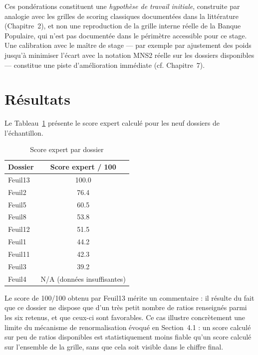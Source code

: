 \begin{limite}
Ces pondérations constituent une \emph{hypothèse de travail initiale}, construite par analogie
avec les grilles de scoring classiques documentées dans la littérature (Chapitre~2), et non une
reproduction de la grille interne réelle de la Banque Populaire, qui n'est pas documentée dans
le périmètre accessible pour ce stage. Une calibration avec le maître de stage — par exemple par
ajustement des poids jusqu'à minimiser l'écart avec la notation MNS2 réelle sur les dossiers
disponibles — constitue une piste d'amélioration immédiate (cf. Chapitre~7).
\end{limite}

\section{Résultats}

Le Tableau~\ref{tab:resultats-grille} présente le score expert calculé pour les neuf dossiers de
l'échantillon.

\begin{table}[h]
\centering
\small
\begin{tabular}{@{}lc@{}}
\toprule
\textbf{Dossier} & \textbf{Score expert / 100} \\
\midrule
Feuil13 & 100.0 \\
Feuil2  & 76.4 \\
Feuil5  & 60.5 \\
Feuil8  & 53.8 \\
Feuil12 & 51.5 \\
Feuil1  & 44.2 \\
Feuil11 & 42.3 \\
Feuil3  & 39.2 \\
Feuil4  & N/A (données insuffisantes) \\
\bottomrule
\end{tabular}
\caption{Score expert par dossier}
\label{tab:resultats-grille}
\end{table}

Le score de 100/100 obtenu par Feuil13 mérite un commentaire : il résulte du fait que ce dossier
ne dispose que d'un très petit nombre de ratios renseignés parmi les six retenus, et que ceux-ci
sont favorables. Ce cas illustre concrètement une limite du mécanisme de renormalisation évoqué
en Section~4.1 : un score calculé sur peu de ratios disponibles est statistiquement moins fiable
qu'un score calculé sur l'ensemble de la grille, sans que cela soit visible dans le chiffre final.

